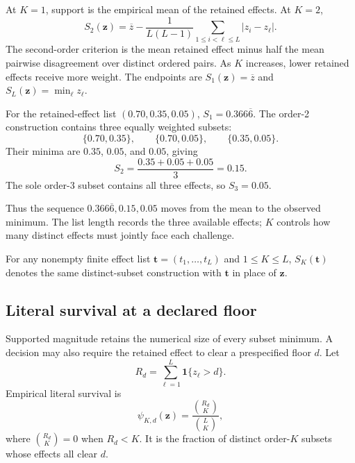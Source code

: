 \documentclass[11pt]{article}
\theoremstyle{remark}
\begin{document}
At $K=1$, support is the empirical mean of the retained effects. At $K=2$,
\begin{equation}
S_2(\mathbf z)
=
\overline z
-
\frac{1}{L(L-1)}
\sum_{1\leq i<\ell\leq L}|z_i-z_\ell|.
\label{eq:k2}
\end{equation}
The second-order criterion is the mean retained effect minus half the mean
pairwise disagreement over distinct ordered pairs. As $K$ increases, lower
retained effects receive more weight. The endpoints are
$S_1(\mathbf z)=\overline z$ and $S_L(\mathbf z)=\min_\ell z_\ell$.

\begin{samepage}
\noindent For the retained-effect list $(0.70,0.35,0.05)$,
$S_1=0.366\overline{6}$. The order-2 construction contains three equally
weighted subsets:
\[
\{0.70,0.35\},\qquad
\{0.70,0.05\},\qquad
\{0.35,0.05\}.
\]
Their minima are $0.35$, $0.05$, and $0.05$, giving
\[
S_2
=
\frac{0.35+0.05+0.05}{3}
=0.15.
\]
The sole order-3 subset contains all three effects, so $S_3=0.05$.
\end{samepage}
Thus the sequence $0.366\overline{6},0.15,0.05$ moves from the mean to
the observed minimum. The list length records the three available effects;
$K$ controls how many distinct effects must jointly face each challenge.

For any nonempty finite effect list $\mathbf t=(t_1,\ldots,t_L)$ and
$1\leq K\leq L$, $S_K(\mathbf t)$ denotes the same distinct-subset
construction with $\mathbf t$ in place of $\mathbf z$.

\subsection{Literal survival at a declared floor}

Supported magnitude retains the numerical size of every subset minimum. A
decision may also require the retained effect to clear a prespecified floor
$d$. Let
\[
R_d
=
\sum_{\ell=1}^L\mathbf 1\{z_\ell>d\}.
\]
Empirical literal survival is
\begin{equation}
\psi_{K,d}(\mathbf z)
=
\frac{\binom{R_d}{K}}{\binom{L}{K}},
\label{eq:literal-survival-main}
\end{equation}
where $\binom{R_d}{K}=0$ when $R_d<K$. It is the fraction of distinct
order-$K$ subsets whose effects all clear $d$.
\end{document}
